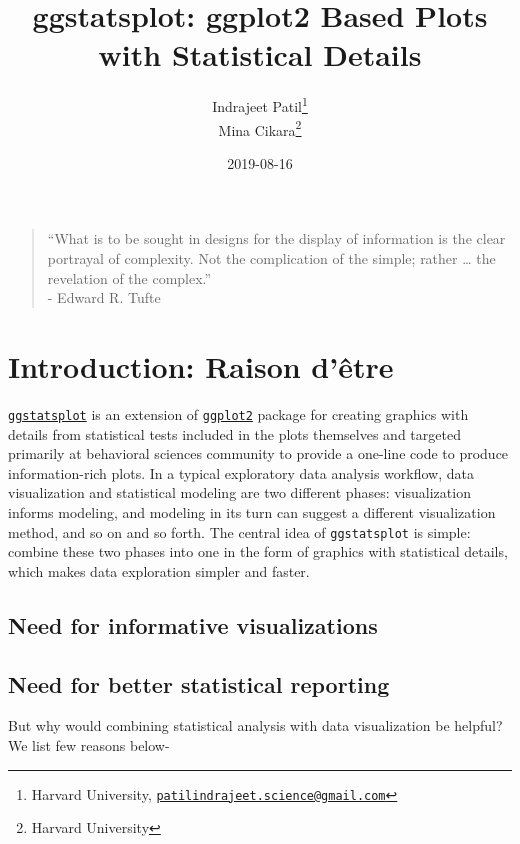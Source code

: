 \documentclass[]{article}
\title{ggstatsplot: ggplot2 Based Plots with Statistical Details}
\author{Indrajeet Patil\footnote{Harvard University, \href{mailto:patilindrajeet.science@gmail.com}{\nolinkurl{patilindrajeet.science@gmail.com}}} \\ Mina Cikara\footnote{Harvard University}}
\date{2019-08-16}
\begin{document}
\maketitle

{
\hypersetup{linkcolor=black}
\setcounter{tocdepth}{2}
\tableofcontents
}
\begin{quote}
``What is to be sought in designs for the display of information is the clear
portrayal of complexity. Not the complication of the simple; rather \ldots{} the
revelation of the complex.''\\
- Edward R. Tufte
\end{quote}

\hypertarget{introduction-raison-detre}{%
\section{Introduction: Raison d'être}\label{introduction-raison-detre}}

\href{https://indrajeetpatil.github.io/ggstatsplot/}{\texttt{ggstatsplot}} is an extension
of \href{https://github.com/tidyverse/ggplot2}{\texttt{ggplot2}} package for creating
graphics with details from statistical tests included in the plots themselves
and targeted primarily at behavioral sciences community to provide a one-line
code to produce information-rich plots. In a typical exploratory data analysis
workflow, data visualization and statistical modeling are two different phases:
visualization informs modeling, and modeling in its turn can suggest a
different visualization method, and so on and so forth. The central idea of
\texttt{ggstatsplot} is simple: combine these two phases into one in the form of
graphics with statistical details, which makes data exploration simpler and
faster.

\hypertarget{need-for-informative-visualizations}{%
\subsection{Need for informative visualizations}\label{need-for-informative-visualizations}}

\hypertarget{need-for-better-statistical-reporting}{%
\subsection{Need for better statistical reporting}\label{need-for-better-statistical-reporting}}

But why would combining statistical analysis with data visualization be helpful?
We list few reasons below-
\end{document}
